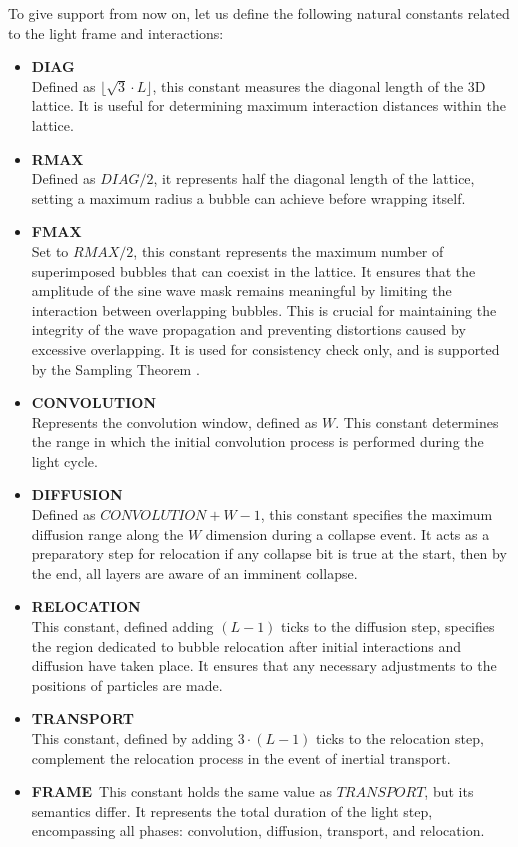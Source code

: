 \documentclass[12pt,english]{article}
\begin{document}
To give support from now on, let us define the following natural constants related to the light frame and interactions:
\begin{itemize}
\item \textbf{DIAG}\\
Defined as $ \lfloor \sqrt{3} \cdot L \rfloor$, this constant measures the diagonal length of the 3D lattice. It is useful for determining maximum interaction distances within the lattice.

\item \textbf{RMAX}\\
Defined as $DIAG/2$, it represents half the diagonal length of the lattice, setting a maximum radius a bubble can achieve before wrapping itself.

\item \textbf{FMAX}\\
Set to $RMAX/2$, this constant represents the maximum number of superimposed bubbles that can coexist in the lattice. It ensures that the amplitude of the sine wave mask remains meaningful by limiting the interaction between overlapping bubbles. This is crucial for maintaining the integrity of the wave propagation and preventing distortions caused by excessive overlapping. It is used for consistency check only, and is supported by the Sampling Theorem \cite{Shannon1949}.

\item \textbf{CONVOLUTION}\\
Represents the convolution window, defined as $W$. This constant determines the range in which the initial convolution process is performed during the light cycle.

\item \textbf{DIFFUSION} \\
Defined as \(CONVOLUTION + W - 1\), this constant specifies the maximum diffusion range along the \(W\) dimension during a collapse event. It acts as a preparatory step for relocation if any collapse bit is true at the start, then by the end, all layers are aware of an imminent collapse.

\item \textbf{RELOCATION}\\
This constant, defined adding $(L-1)$ ticks to the diffusion step, specifies the region dedicated to bubble relocation after initial interactions and diffusion have taken place. It ensures that any necessary adjustments to the positions of particles are made.

\item \textbf{TRANSPORT} \\  
This constant, defined by adding \(3\cdot (L-1)\) ticks to the relocation step, complement the relocation process in the event of inertial transport.

\item \textbf{FRAME}\
This constant holds the same value as $TRANSPORT$, but its semantics differ. It represents the total duration of the light step, encompassing all phases: convolution, diffusion, transport, and relocation.

\end{itemize}
\end{document}
